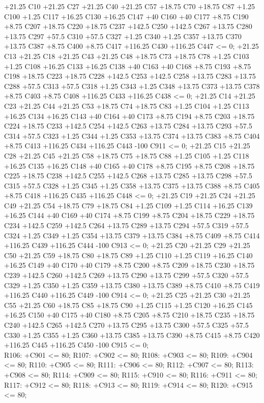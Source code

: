 +21.25 C10 +21.25 C27 +21.25 C40 +21.25 C57 +18.75 C70 +18.75 C87 +1.25 C100 +1.25 C117 +16.25 C130 +16.25 C147
 +40 C160 +40 C177 +8.75 C190 +8.75 C207 +18.75 C220 +18.75 C237 +142.5 C250 +142.5 C267 +13.75 C280
 +13.75 C297 +57.5 C310 +57.5 C327 +1.25 C340 +1.25 C357 +13.75 C370 +13.75 C387 +8.75 C400 +8.75 C417
 +116.25 C430 +116.25 C447 <= 0;
+21.25 C13 +21.25 C18 +21.25 C43 +21.25 C48 +18.75 C73 +18.75 C78 +1.25 C103 +1.25 C108 +16.25 C133 +16.25 C138
 +40 C163 +40 C168 +8.75 C193 +8.75 C198 +18.75 C223 +18.75 C228 +142.5 C253 +142.5 C258 +13.75 C283
 +13.75 C288 +57.5 C313 +57.5 C318 +1.25 C343 +1.25 C348 +13.75 C373 +13.75 C378 +8.75 C403 +8.75 C408
 +116.25 C433 +116.25 C438 <= 0;
+21.25 C14 +21.25 C23 +21.25 C44 +21.25 C53 +18.75 C74 +18.75 C83 +1.25 C104 +1.25 C113 +16.25 C134 +16.25 C143
 +40 C164 +40 C173 +8.75 C194 +8.75 C203 +18.75 C224 +18.75 C233 +142.5 C254 +142.5 C263 +13.75 C284
 +13.75 C293 +57.5 C314 +57.5 C323 +1.25 C344 +1.25 C353 +13.75 C374 +13.75 C383 +8.75 C404 +8.75 C413
 +116.25 C434 +116.25 C443 -100 C911 <= 0;
+21.25 C15 +21.25 C28 +21.25 C45 +21.25 C58 +18.75 C75 +18.75 C88 +1.25 C105 +1.25 C118 +16.25 C135 +16.25 C148
 +40 C165 +40 C178 +8.75 C195 +8.75 C208 +18.75 C225 +18.75 C238 +142.5 C255 +142.5 C268 +13.75 C285
 +13.75 C298 +57.5 C315 +57.5 C328 +1.25 C345 +1.25 C358 +13.75 C375 +13.75 C388 +8.75 C405 +8.75 C418
 +116.25 C435 +116.25 C448 <= 0;
+21.25 C19 +21.25 C24 +21.25 C49 +21.25 C54 +18.75 C79 +18.75 C84 +1.25 C109 +1.25 C114 +16.25 C139 +16.25 C144
 +40 C169 +40 C174 +8.75 C199 +8.75 C204 +18.75 C229 +18.75 C234 +142.5 C259 +142.5 C264 +13.75 C289
 +13.75 C294 +57.5 C319 +57.5 C324 +1.25 C349 +1.25 C354 +13.75 C379 +13.75 C384 +8.75 C409 +8.75 C414
 +116.25 C439 +116.25 C444 -100 C913 <= 0;
+21.25 C20 +21.25 C29 +21.25 C50 +21.25 C59 +18.75 C80 +18.75 C89 +1.25 C110 +1.25 C119 +16.25 C140 +16.25 C149
 +40 C170 +40 C179 +8.75 C200 +8.75 C209 +18.75 C230 +18.75 C239 +142.5 C260 +142.5 C269 +13.75 C290
 +13.75 C299 +57.5 C320 +57.5 C329 +1.25 C350 +1.25 C359 +13.75 C380 +13.75 C389 +8.75 C410 +8.75 C419
 +116.25 C440 +116.25 C449 -100 C914 <= 0;
+21.25 C25 +21.25 C30 +21.25 C55 +21.25 C60 +18.75 C85 +18.75 C90 +1.25 C115 +1.25 C120 +16.25 C145 +16.25 C150
 +40 C175 +40 C180 +8.75 C205 +8.75 C210 +18.75 C235 +18.75 C240 +142.5 C265 +142.5 C270 +13.75 C295
 +13.75 C300 +57.5 C325 +57.5 C330 +1.25 C355 +1.25 C360 +13.75 C385 +13.75 C390 +8.75 C415 +8.75 C420
 +116.25 C445 +116.25 C450 -100 C915 <= 0; \\
R106: +C901 <= 80;
R107: +C902 <= 80;
R108: +C903 <= 80;
R109: +C904 <= 80;
R110: +C905 <= 80;
R111: +C906 <= 80;
R112: +C907 <= 80;
R113: +C908 <= 80;
R114: +C909 <= 80;
R115: +C910 <= 80;
R116: +C911 <= 80;
R117: +C912 <= 80;
R118: +C913 <= 80;
R119: +C914 <= 80;
R120: +C915 <= 80; \\

